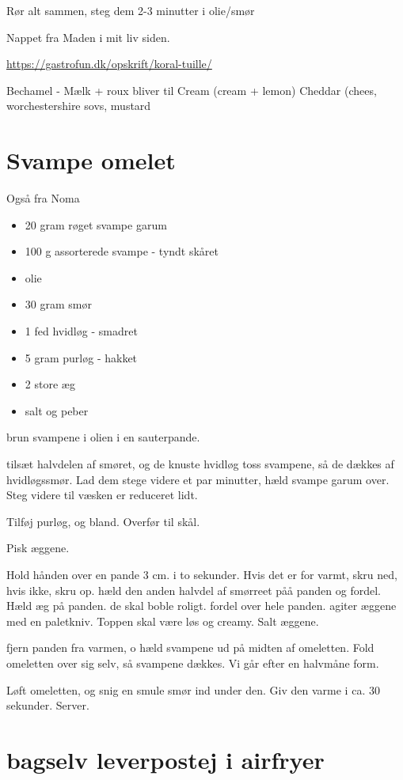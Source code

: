 \documentclass[
]{book}
\providecommand{\tightlist}{%
  \setlength{\itemsep}{0pt}\setlength{\parskip}{0pt}}
\begin{document}
Rør alt sammen, steg dem 2-3 minutter i olie/smør

Nappet fra Maden i mit liv siden.

\url{https://gastrofun.dk/opskrift/koral-tuille/}

Bechamel - Mælk + roux
bliver til
Cream (cream + lemon)
Cheddar (chees, worchestershire sovs, mustard

\hypertarget{svampe-omelet}{%
\section{Svampe omelet}\label{svampe-omelet}}

Også fra Noma

\begin{itemize}
\tightlist
\item
  20 gram røget svampe garum
\item
  100 g assorterede svampe - tyndt skåret
\item
  olie
\item
  30 gram smør
\item
  1 fed hvidløg - smadret
\item
  5 gram purløg - hakket
\item
  2 store æg
\item
  salt og peber
\end{itemize}

brun svampene i olien i en sauterpande.

tilsæt halvdelen af smøret, og de knuste hvidløg
toss svampene, så de dækkes af hvidløgssmør.
Lad dem stege videre et par minutter, hæld svampe garum over. Steg videre til væsken er reduceret lidt.

Tilføj purløg, og bland. Overfør til skål.

Pisk æggene.

Hold hånden over en pande 3 cm. i to sekunder. Hvis det er for varmt, skru ned, hvis ikke, skru op.
hæld den anden halvdel af smørreet påå panden og fordel.
Hæld æg på panden. de skal boble roligt. fordel over hele panden. agiter æggene med en paletkniv.
Toppen skal være løs og creamy. Salt æggene.

fjern panden fra varmen, o hæld svampene ud på midten af omeletten.
Fold omeletten over sig selv, så svampene dækkes. Vi går efter en halvmåne form.

Løft omeletten, og snig en smule smør ind under den. Giv den varme i ca. 30 sekunder. Server.

\hypertarget{bagselv-leverpostej-i-airfryer}{%
\section{bagselv leverpostej i airfryer}\label{bagselv-leverpostej-i-airfryer}}
\end{document}
